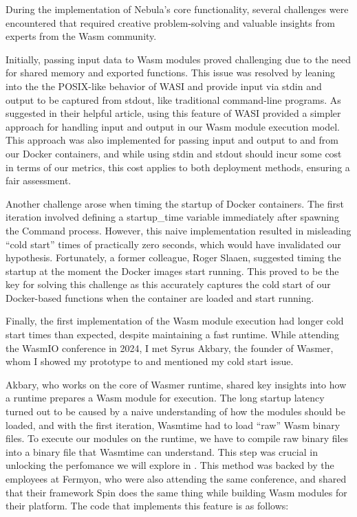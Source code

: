 \documentclass[
  table]{report}
\begin{document}
During the implementation of Nebula's core functionality, several
challenges were encountered that required creative problem-solving and
valuable insights from experts from the \ac{Wasm} community.

Initially, passing input data to Wasm modules proved challenging due to
the need for shared memory and exported functions. This issue was
resolved by leaning into the the POSIX-like behavior of WASI and provide
input via stdin and output to be captured from stdout, like traditional
command-line programs. As \citet{malmgrenGettingDataOut2022a} suggested
in their helpful article, using this feature of WASI provided a simpler
approach for handling input and output in our Wasm module execution
model. This approach was also implemented for passing input and output
to and from our Docker containers, and while using stdin and stdout
should incur some cost in terms of our metrics, this cost applies to
both deployment methods, ensuring a fair assessment.

Another challenge arose when timing the startup of Docker containers.
The first iteration involved defining a startup\_time variable
immediately after spawning the Command process. However, this naive
implementation resulted in misleading ``cold start'' times of
practically zero seconds, which would have invalidated our hypothesis.
Fortunately, a former colleague, Roger Slaaen, suggested timing the
startup at the moment the Docker images start running. This proved to be
the key for solving this challenge as this accurately captures the cold
start of our Docker-based functions when the container are loaded and
start running.

Finally, the first implementation of the \ac{Wasm} module execution had
longer cold start times than expected, despite maintaining a fast
runtime. While attending the WasmIO conference in 2024, I met Syrus
Akbary, the founder of Wasmer, whom I showed my prototype to and
mentioned my cold start issue.

Akbary, who works on the core of Wasmer runtime, shared key insights
into how a runtime prepares a \ac{Wasm} module for execution. The long
startup latency turned out to be caused by a naive understanding of how
the modules should be loaded, and with the first iteration, Wasmtime had
to load ``raw'' Wasm binary files. To execute our modules on the
runtime, we have to compile raw binary files into a binary file that
Wasmtime can understand. This step was crucial in unlocking the
perfomance we will explore in . This method was
backed by the employees at Fermyon, who were also attending the same
conference, and shared that their framework Spin does the same thing
while building \ac{Wasm} modules for their platform. The code that
implements this feature is as follows:
\end{document}
